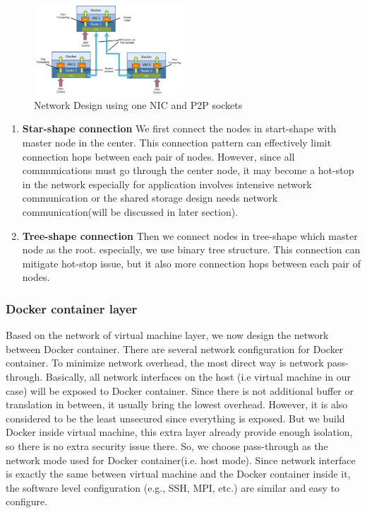 \begin{figure}[h]
    \centering
    \caption{Network Design using one NIC and P2P sockets}
    \label{p2p}
    \includegraphics[width=0.5\textwidth]{figures/p2p.pdf}
\end{figure}

\begin{enumerate}
\item \textbf{Star-shape connection}
We first connect the nodes in start-shape with master node in the center. This connection pattern can effectively limit connection hops between each pair of nodes. However, since all communications must go through the center node, it may become a hot-stop in the network especially for application involves intensive network communication or the shared storage design needs network communication(will be discussed in later section).
\item \textbf{Tree-shape connection}
Then we connect nodes in tree-shape which master node as the root. especially, we use binary tree structure. This connection can mitigate hot-stop issue, but it also more connection hops between each pair of nodes.
\end{enumerate}

\subsubsection{Docker container layer}
Based on the network of virtual machine layer, we now design the network between Docker container. There are several network configuration for Docker container. To minimize network overhead, the most direct way is network pass-through. Basically, all network interfaces on the host (i.e virtual machine in our case) will be exposed to Docker container. Since there is not additional buffer or translation in between, it usually bring the lowest overhead. However, it is also considered to be the least unsecured since everything is exposed. But we build Docker inside virtual machine, this extra layer already provide enough isolation, so there is no extra security issue there. So, we choose pass-through as the network mode used for Docker container(i.e. host mode). Since network interface is exactly the same between virtual machine and the Docker container inside it, the software level configuration (e.g., SSH, MPI, etc.) are similar and easy to configure.

